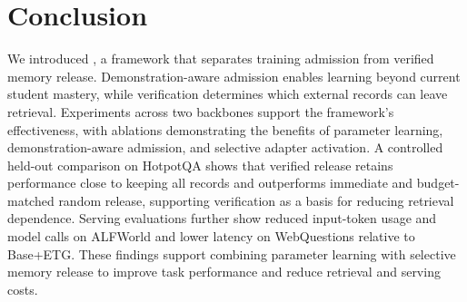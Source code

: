 \section{Conclusion}
\label{sec:conclusion}

We introduced \method, a framework that separates
training admission from verified memory release.
Demonstration-aware admission enables learning beyond
current student mastery, while verification determines
which external records can leave retrieval.
Experiments across two backbones support the framework's
effectiveness, with ablations demonstrating the benefits
of parameter learning, demonstration-aware admission,
and selective adapter activation.
A controlled held-out comparison on HotpotQA shows that
verified release retains performance close to keeping
all records and outperforms immediate and budget-matched
random release, supporting verification as a basis for
reducing retrieval dependence.
Serving evaluations further show reduced input-token
usage and model calls on ALFWorld and lower latency on
WebQuestions relative to Base+ETG.
These findings support combining parameter learning
with selective memory release to improve task performance
and reduce retrieval and serving costs.
